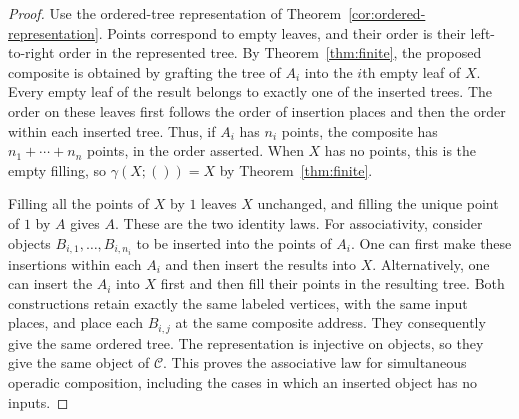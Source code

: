\documentclass[11pt,a4paper]{article}
\theoremstyle{plain}
\theoremstyle{definition}
\theoremstyle{remark}
\newcommand{\C}{\mathcal C}
\newcommand{\one}{1}
\begin{document}
\begin{proof}
Use the ordered-tree representation of
Theorem~\ref{cor:ordered-representation}. Points correspond to
empty leaves, and their order is their left-to-right order in the
represented tree. By Theorem~\ref{thm:finite}, the proposed
composite is obtained by grafting the tree of $A_i$ into the
$i$th empty leaf of $X$. Every empty leaf of the result belongs
to exactly one of the inserted trees. The order on these leaves
first follows the order of insertion places and then the order
within each inserted tree. Thus, if $A_i$ has $n_i$ points, the
composite has $n_1+\cdots+n_n$ points, in the order asserted.
When $X$ has no points, this is the empty filling, so
$\gamma(X;())=X$ by Theorem~\ref{thm:finite}.

Filling all the points of $X$ by $\one$ leaves $X$ unchanged,
and filling the unique point of $\one$ by $A$ gives $A$. These
are the two identity laws. For associativity, consider objects
$B_{i,1},\ldots,B_{i,n_i}$ to be inserted into the points of
$A_i$. One can first make these insertions within each $A_i$
and then insert the results into $X$. Alternatively, one can
insert the $A_i$ into $X$ first and then fill their points in
the resulting tree. Both constructions retain exactly the same
labeled vertices, with the same input places, and place each
$B_{i,j}$ at the same composite address. They consequently give
the same ordered tree. The representation is injective on
objects, so they give the same object of $\C$. This proves the
associative law for simultaneous operadic composition, including
the cases in which an inserted object has no inputs.


\end{proof}
\end{document}
